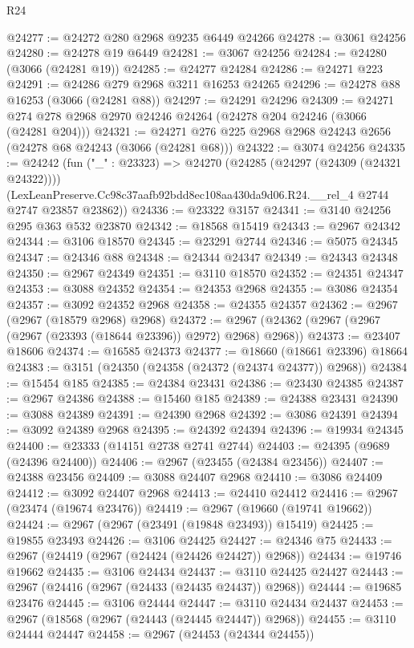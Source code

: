 \begin{lexlean}{R24}
\begin{coremodule}
@24277 := @24272 @280 @2968 @9235 @6449 @24266
@24278 := @3061 @24256
@24280 := @24278 @19 @6449
@24281 := @3067 @24256
@24284 := @24280 (@3066 (@24281 @19))
@24285 := @24277 @24284
@24286 := @24271 @223
@24291 := @24286 @279 @2968 @3211 @16253 @24265
@24296 := @24278 @88 @16253 (@3066 (@24281 @88))
@24297 := @24291 @24296
@24309 := @24271 @274 @278 @2968 @2970 @24246 @24264 (@24278 @204 @24246 (@3066 (@24281 @204)))
@24321 := @24271 @276 @225 @2968 @2968 @24243 @2656 (@24278 @68 @24243 (@3066 (@24281 @68)))
@24322 := @3074 @24256
@24335 := @24242
    (fun ("_" : @23323) =>
    @24270
      (@24285 (@24297 (@24309 (@24321 @24322))))
      (LexLeanPreserve.Cc98c37aafb92bdd8ec108aa430da9d06.R24.__rel_4 @2744 @2747 @23857 @23862))
@24336 := @23322 @3157
@24341 := @3140 @24256 @295 @363 @532 @23870
@24342 := @18568 @15419
@24343 := @2967 @24342
@24344 := @3106 @18570
@24345 := @23291 @2744
@24346 := @5075 @24345
@24347 := @24346 @88
@24348 := @24344 @24347
@24349 := @24343 @24348
@24350 := @2967 @24349
@24351 := @3110 @18570
@24352 := @24351 @24347
@24353 := @3088 @24352
@24354 := @24353 @2968
@24355 := @3086 @24354
@24357 := @3092 @24352 @2968
@24358 := @24355 @24357
@24362 := @2967 (@2967 (@18579 @2968) @2968)
@24372 := @2967 (@24362 (@2967 (@2967 (@2967 (@23393 (@18644 @23396)) @2972) @2968) @2968))
@24373 := @23407 @18606
@24374 := @16585 @24373
@24377 := @18660 (@18661 @23396) @18664
@24383 := @3151 (@24350 (@24358 (@24372 (@24374 @24377)) @2968))
@24384 := @15454 @185
@24385 := @24384 @23431
@24386 := @23430 @24385
@24387 := @2967 @24386
@24388 := @15460 @185
@24389 := @24388 @23431
@24390 := @3088 @24389
@24391 := @24390 @2968
@24392 := @3086 @24391
@24394 := @3092 @24389 @2968
@24395 := @24392 @24394
@24396 := @19934 @24345
@24400 := @23333 (@14151 @2738 @2741 @2744)
@24403 := @24395 (@9689 (@24396 @24400))
@24406 := @2967 (@23455 (@24384 @23456))
@24407 := @24388 @23456
@24409 := @3088 @24407 @2968
@24410 := @3086 @24409
@24412 := @3092 @24407 @2968
@24413 := @24410 @24412
@24416 := @2967 (@23474 (@19674 @23476))
@24419 := @2967 (@19660 (@19741 @19662))
@24424 := @2967 (@2967 (@23491 (@19848 @23493)) @15419)
@24425 := @19855 @23493
@24426 := @3106 @24425
@24427 := @24346 @75
@24433 := @2967 (@24419 (@2967 (@24424 (@24426 @24427)) @2968))
@24434 := @19746 @19662
@24435 := @3106 @24434
@24437 := @3110 @24425 @24427
@24443 := @2967 (@24416 (@2967 (@24433 (@24435 @24437)) @2968))
@24444 := @19685 @23476
@24445 := @3106 @24444
@24447 := @3110 @24434 @24437
@24453 := @2967 (@18568 (@2967 (@24443 (@24445 @24447)) @2968))
@24455 := @3110 @24444 @24447
@24458 := @2967 (@24453 (@24344 @24455))

\end{coremodule}
\end{lexlean}

